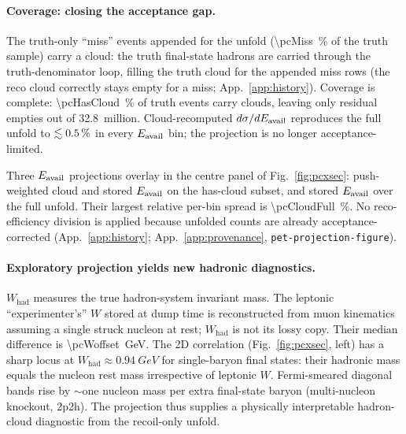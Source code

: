 \paragraph{Coverage: closing the acceptance gap.} The truth-only ``miss'' events appended for the unfold (\SI{\pcMiss}{\percent} of the truth sample) carry a cloud: the truth final-state hadrons are carried through the truth-denominator loop, filling the truth cloud for the appended miss rows (the reco cloud correctly stays empty for a miss; App.~\ref{app:history}). Coverage is complete: \SI{\pcHasCloud}{\percent} of truth events carry clouds, leaving only \pcEmptyCloud{} residual empties out of \num{32.8}~million. Cloud-recomputed $d\sigma/dE_{\mathrm{avail}}$ reproduces the full unfold to $\lesssim\SI{0.5}{\percent}$ in every $E_{\mathrm{avail}}$ bin; the projection is no longer acceptance-limited.

Three $E_{\mathrm{avail}}$ projections overlay in the centre panel of Fig.~\ref{fig:pcxsec}: push-weighted cloud and stored $E_{\mathrm{avail}}$ on the has-cloud subset, and stored $E_{\mathrm{avail}}$ over the full unfold. Their largest relative per-bin spread is \SI{\pcCloudFull}{\percent}. No reco-efficiency division is applied because unfolded counts are already acceptance-corrected (App.~\ref{app:history}; App.~\ref{app:provenance}, \texttt{pet-projection-figure}).

\paragraph{Exploratory projection yields new hadronic diagnostics.} $W_{\text{had}}$ measures the true hadron-system invariant mass. The leptonic ``experimenter's'' $W$ stored at dump time is reconstructed from muon kinematics assuming a single struck nucleon at rest; $W_{\text{had}}$ is not its lossy copy. Their median difference is \SI{\pcWoffset}{GeV}. The 2D correlation (Fig.~\ref{fig:pcxsec}, left) has a sharp locus at $W_{\text{had}}\approx\SI{0.94}{GeV}$ for single-baryon final states: their hadronic mass equals the nucleon rest mass irrespective of leptonic $W$. Fermi-smeared diagonal bands rise by $\sim$one nucleon mass per extra final-state baryon (multi-nucleon knockout, 2p2h). The projection thus supplies a physically interpretable hadron-cloud diagnostic from the recoil-only unfold.

